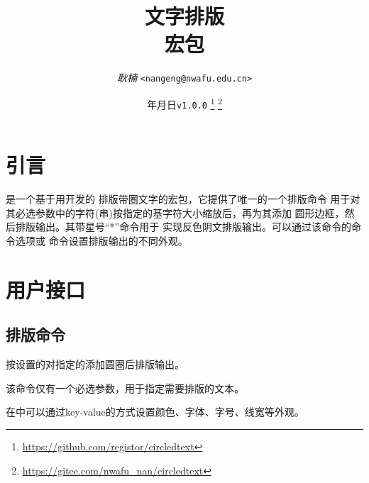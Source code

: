 \documentclass[full]{l3doc}
\def\vers{\texttt{v1.0.0} }
\begin{document}
\title{
  文字排版\\ 宏包
}
\author{\textit{耿楠} \texttt{<nangeng@nwafu.edu.cn>}}
\date{\the\year 年\the\month 月\the\day 日\qquad \vers
\thanks{\url{https://github.com/registor/circledtext}}
\thanks{\url{https://gitee.com/nwafu_nan/circledtext}}
}
\maketitle

{\small
\tableofcontents
}
\newpage

\begin{documentation}

\section{引言}

是一个基于用开发的
排版带圈文字的宏包，它提供了唯一的一个排版命令%
用于对其必选参数中的字符(串)按指定的基字符大小缩放后，再为其添加
圆形边框，然后排版输出。其带星号``*''命令用于
实现反色阴文排版输出。可以通过该命令的命令选项或%
命令设置排版输出的不同外观。

\section{用户接口}

\subsection{排版命令}

\begin{function}{\circledtext}
  \begin{syntax}
      
  \end{syntax}
\end{function}

  按设置的对指定的添加圆圈后排版输出。

  该命令仅有一个必选参数，用于指定需要排版的文本。

  在中可以通过key-value的方式设置颜色、字体、字号、线宽等外观。


\end{documentation}
\end{document}
